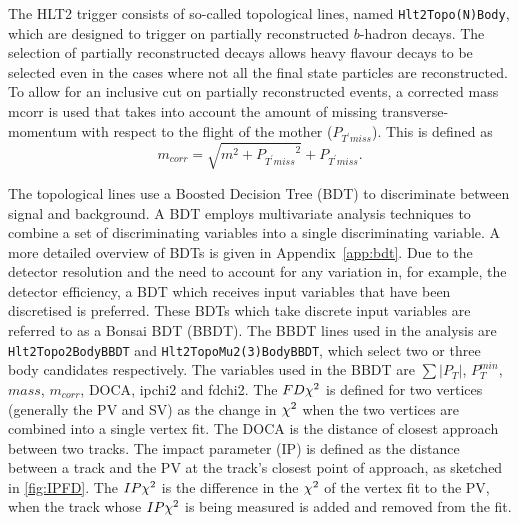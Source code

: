    
The HLT2 trigger consists of so-called topological lines, named \texttt{Hlt2Topo(N)Body}, which are designed to trigger on partially reconstructed $b$-hadron decays. The selection of partially reconstructed decays allows heavy flavour decays to be selected even in the cases where not all the final state particles are reconstructed.    
To allow for an inclusive cut on partially reconstructed events, a corrected mass \gls{mcorr} is used that takes into account the amount of missing transverse-momentum with respect to the flight of the mother ($P_{T^{\prime} miss}$). This is defined as
\begin{equation}
  m_{corr} = \sqrt{m^{2} + {P_{T^{\prime} miss}}^{2}} + P_{T^{\prime}miss}.
\end{equation}

The topological lines use a Boosted Decision Tree (\Gls{BDT}) \cite{miniboone} to discriminate between signal and background. A BDT employs multivariate analysis techniques to combine a set of discriminating variables into a single discriminating variable. A more detailed overview of BDTs is given in Appendix~\ref{app:bdt}. Due to the detector resolution and the need to account for any variation in, for example, the detector efficiency, a BDT which receives input variables that have been discretised is preferred. These BDTs which take discrete input variables are referred to as a Bonsai BDT (\Gls{BBDT})\cite{bonsai}. The BBDT lines used in the \Lbpi analysis are \texttt{Hlt2Topo2BodyBBDT} and \texttt{Hlt2TopoMu2(3)BodyBBDT}, which select two or three body candidates respectively. The variables used in the BBDT are $\sum|P_{T}|$, $P^{min}_{T}$, $mass$, $m_{corr}$, \Gls{DOCA}, \gls{ipchi2} and \gls{fdchi2}\cite{BBDTstuff}\cite{Puig:1970930}. The $FD\chi^2$ is defined for two vertices (generally the PV and SV) as the change in $\chi^2$ when the two vertices are combined into a single vertex fit. The DOCA is the distance of closest approach between two tracks. The impact parameter (\Gls{IP}) is defined as the distance between a track and the PV at the track's closest point of approach, as sketched in \autoref{fig:IPFD}. The $IP\chi^2$ is the difference in the $\chi^2$ of the vertex fit to the PV, when the track whose $IP\chi^2$ is being measured is added and removed from the fit.

